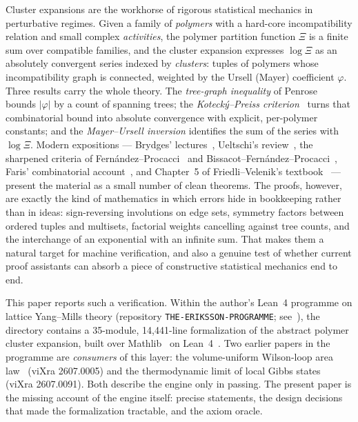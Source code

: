 \documentclass[11pt]{article}
\theoremstyle{definition}
\theoremstyle{remark}
\newcommand{\file}[1]{{\normalfont\path{#1}}}
\newcommand{\Ur}{\varphi}
\begin{document}
Cluster expansions are the workhorse of rigorous statistical mechanics in
perturbative regimes.  Given a family of \emph{polymers} with a hard-core
incompatibility relation and small complex \emph{activities}, the polymer
partition function $\Xi$ is a finite sum over compatible families, and the
cluster expansion expresses $\log \Xi$ as an absolutely convergent series
indexed by \emph{clusters}: tuples of polymers whose incompatibility graph is
connected, weighted by the Ursell (Mayer) coefficient $\Ur$.  Three results
carry the whole theory.  The \emph{tree-graph inequality} of
Penrose~\cite{Penrose1967} bounds $|\Ur|$ by a count of spanning trees; the
\emph{Koteck\'y--Preiss criterion}~\cite{KoteckyPreiss1986} turns that
combinatorial bound into absolute convergence with explicit, per-polymer
constants; and the \emph{Mayer--Ursell inversion} identifies the sum of the
series with $\log \Xi$.  Modern expositions --- Brydges' lectures~\cite{Brydges1986},
Ueltschi's review~\cite{Ueltschi2004}, the sharpened criteria of
Fern\'andez--Procacci~\cite{FernandezProcacci2007} and
Bissacot--Fern\'andez--Procacci~\cite{BFP2010}, Faris' combinatorial
account~\cite{Faris2010}, and Chapter~5 of Friedli--Velenik's
textbook~\cite{FriedliVelenik2017} --- present the material as a small number
of clean theorems.  The proofs, however, are exactly the kind of mathematics
in which errors hide in bookkeeping rather than in ideas: sign-reversing
involutions on edge sets, symmetry factors between ordered tuples and
multisets, factorial weights cancelling against tree counts, and the
interchange of an exponential with an infinite sum.  That makes them a natural
target for machine verification, and also a genuine test of whether current
proof assistants can absorb a piece of constructive statistical mechanics
end to end.

This paper reports such a verification.  Within the author's Lean~4
programme on lattice Yang--Mills theory (repository
\texttt{THE-ERIKSSON-PROGRAMME}; see~\cite{Eriksson2026Master,Eriksson2026Audit}),
the directory \file{YangMills/KP/} contains a 35-module, 14{,}441-line
formalization of the abstract polymer cluster expansion, built over
Mathlib~\cite{mathlib} on Lean~4~\cite{Lean4}.  Two earlier papers in the
programme are \emph{consumers} of this layer: the volume-uniform Wilson-loop
area law~\cite{Eriksson2026AreaLaw} (viXra 2607.0005) and the thermodynamic
limit of local Gibbs states~\cite{Eriksson2026ThermoLimit} (viXra 2607.0091).
Both describe the engine only in passing.  The present paper is the missing
account of the engine itself: precise statements, the design decisions that
made the formalization tractable, and the axiom oracle.
\end{document}
